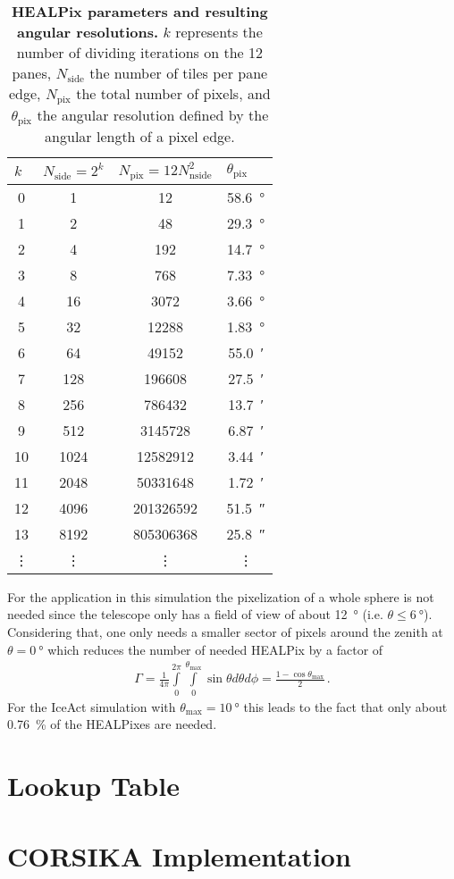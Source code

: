 \begin{table}[h]
\centering
\begin{tabular}{S[table-format=2.0]|S[table-format=4.0]|S[table-format=9.0]|S[table-format=2.2]}
 &  &  &  \\
  & 1    & 12        &  \SI{58.6}{\degree}\\
1  & 2    & 48        &  \SI{29.3}{\degree}\\
2  & 4    & 192       &  \SI{14.7}{\degree}\\
3  & 8    & 768 	  &  \SI{7.33}{\degree}\\
4  & 16   & 3072      &  \SI{3.66}{\degree}\\
5  & 32   & 12288     &  \SI{1.83}{\degree}\\
6  & 64   & 49152     &  \SI{55.0}{\arcminute}\\
7  & 128  & 196608    &  \SI{27.5}{\arcminute}\\
8  & 256  & 786432    &  \SI{13.7}{\arcminute}\\
9  & 512  & 3145728   &  \SI{6.87}{\arcminute}\\
10 & 1024 & 12582912  &  \SI{3.44}{\arcminute}\\
11 & 2048 & 50331648  &  \SI{1.72}{\arcminute}\\
12 & 4096 & 201326592 &  \SI{51.5}{\arcsecond}\\
13 & 8192 & 805306368 &  \SI{25.8}{\arcsecond}\\
 &  &  &  \\
\end{tabular}
\caption[HEALPix parameters and resulting angular resolutions]{\textbf{HEALPix parameters and resulting angular resolutions.} $k$ represents the number of dividing iterations on the 12 panes, $N_\text{side}$ the number of tiles per pane edge, $N_\text{pix}$ the total number of pixels, and $\theta_\text{pix}$ the angular resolution defined by the angular length of a pixel edge. \cite{healpix:paper}}
\end{table}

For the application in this simulation the pixelization of a whole sphere is not needed since the telescope only has a field of view of about \SI{12}{\degree} (i.e. $\theta \leq \SI{6}{\degree}$). Considering that, one only needs a smaller sector of pixels around the zenith at $\theta = \SI{0}{\degree}$ which reduces the number of needed HEALPix by a factor of
\begin{align}
	\Gamma = \frac{1}{4\pi}\int\limits_{0}^{2\pi}\int\limits_{0}^{\theta_\text{max}}\sin{\theta} d\theta d\phi = \frac{1-\cos\theta_\text{max}}{2}\,.
\end{align}
For the IceAct simulation with $\theta_\text{max} = \SI{10}{\degree}$ this leads to the fact that only about \SI{0.76}{\percent} of the HEALPixes are needed.

\section{Lookup Table}

\section{CORSIKA Implementation}
